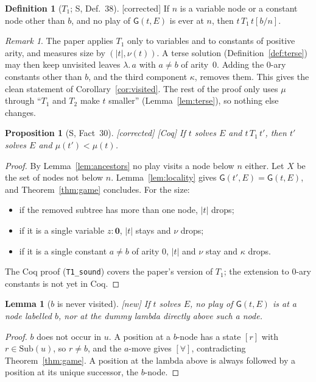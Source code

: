 \documentclass[11pt]{article}
\newcommand{\Ground}{\mathbf{0}}
\newcommand{\Sub}{\mathrm{Sub}}
\newcommand{\Gm}{\mathsf{G}}
\newcommand{\Fixed}{\textsf{[corrected]}}
\newcommand{\New}{\textsf{[new]}}
\newcommand{\Coq}{\textsf{[Coq]}}
\theoremstyle{plain}
\newtheorem{proposition}[theorem]{Proposition}
\newtheorem{lemma}[theorem]{Lemma}
\theoremstyle{definition}
\newtheorem{definition}[theorem]{Definition}
\theoremstyle{remark}
\newtheorem{remark}[theorem]{Remark}
\begin{document}
\begin{definition}[$T_1$; S, Def.~38]\label{def:T1}
\Fixed{} If $n$ is a variable node or a constant node other than $b$,
and no play of $\Gm(t,E)$ is ever at $n$, then $t\,T_1\,t[b/n]$.
\end{definition}

\begin{remark}
The paper applies $T_1$ only to variables and to constants of positive
arity, and measures size by $(|t|,\nu(t))$.  A terse solution
(Definition~\ref{def:terse}) may then keep unvisited leaves $\lambda.\,a$ with $a\ne b$ of arity~$0$.
Adding the 0-ary constants other than $b$, and the third component
$\kappa$, removes them.  This gives the clean statement of
Corollary~\ref{cor:visited}.  The rest of the proof only uses $\mu$
through ``$T_1$ and $T_2$ make $t$ smaller'' (Lemma~\ref{lem:terse}),
so nothing else changes.
\end{remark}

\begin{proposition}[S, Fact~30]\label{prop:T1}
\Fixed{} \Coq{} If $t$ solves $E$ and $t\,T_1\,t'$, then $t'$ solves $E$
and $\mu(t')<\mu(t)$.
\end{proposition}
\begin{proof}
By Lemma~\ref{lem:ancestors} no play visits a node below $n$ either.
Let $X$ be the set of nodes not below $n$.  Lemma~\ref{lem:locality}
gives $\Gm(t',E)=\Gm(t,E)$, and Theorem~\ref{thm:game} concludes.  For
the size:
\begin{itemize}
\item if the removed subtree has more than one node, $|t|$ drops;
\item if it is a single variable $z:\Ground$, $|t|$ stays and $\nu$
  drops;
\item if it is a single constant $a\ne b$ of arity $0$, $|t|$ and $\nu$
  stay and $\kappa$ drops.
\end{itemize}
The Coq proof (\texttt{T1\_sound}) covers the paper's version of $T_1$;
the extension to 0-ary constants is not yet in Coq.
\end{proof}

\begin{lemma}[$b$ is never visited]\label{lem:bnotvisited}
\New{} If $t$ solves $E$, no play of $\Gm(t,E)$ is at a node labelled
$b$, nor at the dummy lambda directly above such a node.
\end{lemma}
\begin{proof}
$b$ does not occur in $u$.  A position at a $b$-node has a state $[r]$
with $r\in\Sub(u)$, so $r\ne b$, and the $a$-move gives $[\forall]$,
contradicting Theorem~\ref{thm:game}.  A position at the lambda above
is always followed by a position at its unique successor, the $b$-node.
\end{proof}
\end{document}
